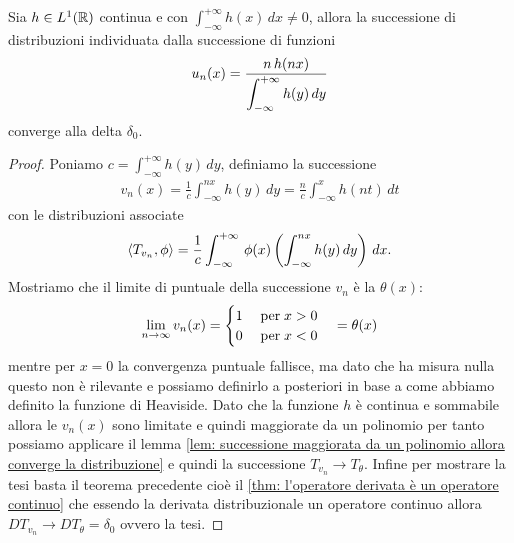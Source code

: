 \begin{lemma}[  ]
  Sia $ h \in L^1(\mathbb{R}) $ continua e con $ \int_{-\infty}^{+\infty} h(x) \,dx \neq 0 $, allora la successione di distribuzioni individuata 
  dalla successione di funzioni 
  \begin{align}
    u_n(x) = \frac{n\, h(nx)}{\displaystyle \int_{-\infty}^{+\infty} h(y) \,dy}
  \end{align}
  converge alla delta $ \delta_0 $.
\end{lemma}
\begin{proof}
  Poniamo $ c = \int_{-\infty}^{+\infty} h(y)\, dy $, definiamo la successione 
  \begin{align}
    v_n(x) = \frac{1}{c} \int_{-\infty}^{nx} h(y) \,dy
    = \frac{n}{c} \int_{-\infty}^{x} h(nt) \,dt
  \end{align}
  con le distribuzioni associate 
  \begin{align}
    \sc{T_{v_n}, \phi} 
    = \frac{1}{c} \int_{-\infty}^{+\infty}\, \phi(x)  \left( \int_{-\infty}^{nx} h(y) \,dy \right) \,dx.
  \end{align}
  Mostriamo che il limite di puntuale della successione $ v_n $ è la $ \theta(x) $:
  \begin{align}
    \lim_{n\to \infty} v_n(x) =
    \begin{cases}
      \displaystyle 1 \; &\textnormal{per} \; x > 0
      \\
      \displaystyle 0 \; &\textnormal{per} \; x < 0
    \end{cases}  
    \quad= \theta(x)
  \end{align}
  mentre per $ x = 0 $ la convergenza puntuale fallisce, ma dato che ha misura nulla questo non è rilevante e possiamo definirlo a posteriori in 
  base a come abbiamo definito la funzione di Heaviside. Dato che la funzione $ h $ è continua e sommabile allora le $ v_n(x) $ sono limitate e 
  quindi maggiorate da un polinomio per tanto possiamo applicare il lemma 
  \ref{lem: successione maggiorata da un polinomio allora converge la distribuzione} e quindi la successione $ T_{v_n} \to T_\theta $. 
  Infine per mostrare la tesi basta il teorema precedente cioè il \ref{thm: l'operatore derivata è un operatore continuo} che essendo la  
  derivata distribuzionale un operatore continuo allora $ DT_{v_n} \to DT_{\theta} = \delta_0 $ ovvero la tesi.
\end{proof}

